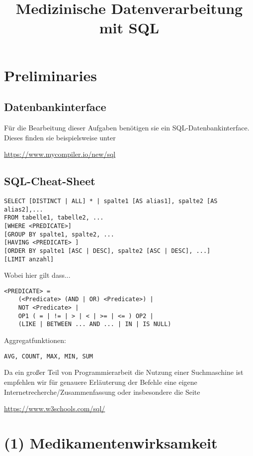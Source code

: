 \documentclass[]{article}
\begin{document}
\title{\textbf{Medizinische Datenverarbeitung mit SQL}}
\maketitle

\section*{Preliminaries}

\subsection*{Datenbankinterface}

Für die Bearbeitung dieser Aufgaben benötigen sie ein SQL-Datenbankinterface. Dieses finden sie beispielsweise unter

\url{https://www.mycompiler.io/new/sql}

\subsection*{SQL-Cheat-Sheet}

\begin{verbatim}
SELECT [DISTINCT | ALL] * | spalte1 [AS alias1], spalte2 [AS alias2],...
FROM tabelle1, tabelle2, ...
[WHERE <PREDICATE>]
[GROUP BY spalte1, spalte2, ... 
[HAVING <PREDICATE> ]
[ORDER BY spalte1 [ASC | DESC], spalte2 [ASC | DESC], ...]
[LIMIT anzahl]
\end{verbatim}
Wobei hier gilt dass...
\begin{verbatim}
<PREDICATE> = 
    (<Predicate> (AND | OR) <Predicate>) |
    NOT <Predicate> |
    OP1 ( = | != | > | < | >= | <= ) OP2 |
    (LIKE | BETWEEN ... AND ... | IN | IS NULL)
\end{verbatim}
Aggregatfunktionen:
\begin{verbatim}
AVG, COUNT, MAX, MIN, SUM
\end{verbatim}

Da ein großer Teil von Programmierarbeit die Nutzung einer Suchmaschine ist empfehlen wir für genauere Erläuterung der Befehle eine eigene Internetrecherche/Zusammenfassung oder insbesondere die Seite 

\url{https://www.w3schools.com/sql/}

\newpage

\section*{(1) Medikamentenwirksamkeit}
\end{document}
